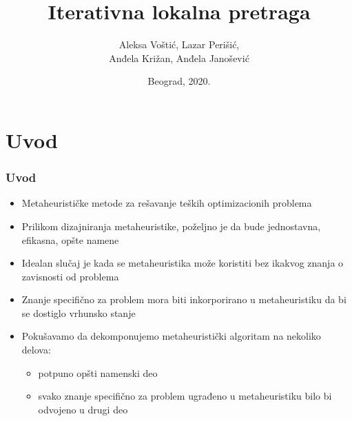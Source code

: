 \documentclass{beamer}
\begin{document}
\title{Iterativna lokalna pretraga}
\author[]{Aleksa Voštić, Lazar Perišić,\\ Anđela Križan, Anđela Janošević}
\date{
	\footnotesize{Beograd, 2020.}	
}

\begin{frame}
	\thispagestyle{empty}
	\titlepage
\end{frame}



\section*{Uvod}
\begin{frame}[fragile]
	\frametitle{Uvod}
	\begin{itemize}
		\item Metaheurističke metode za rešavanje teških optimizacionih problema
		\item Prilikom dizajniranja metaheuristike, poželjno je da bude jednostavna, efikasna, opšte namene
		\item Idealan slučaj je kada se metaheuristika može koristiti bez ikakvog znanja o zavisnosti od problema
		\item Znanje specifično za problem mora biti inkorporirano u metaheuristiku da bi se dostiglo vrhunsko stanje
		\item Pokušavamo da dekomponujemo metaheuristički algoritam na nekoliko delova:
		\begin{itemize}
			\item potpuno opšti namenski deo
			\item svako znanje specifično za problem ugrađeno u metaheuristiku bilo bi odvojeno u drugi deo
		\end{itemize}
	\end{itemize}

\end{frame}
\end{document}
